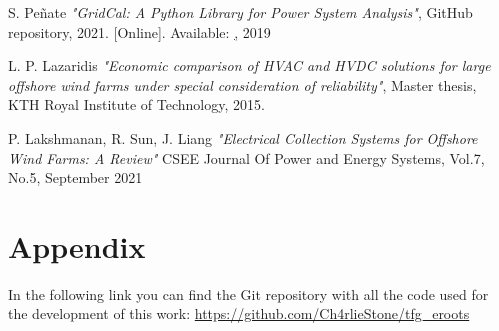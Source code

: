 \documentclass[a4paper,11pt, titlepage, twoside]{article}
\begin{document}
\begin{thebibliography}{99}
{S. Peñate}
\textit{"GridCal: A Python Library for Power System Analysis"}, GitHub repository, 2021. [Online]. Available: \href{https://github.com/SanPen/GridCal}, 2019

{L. P. Lazaridis}
\textit{"Economic comparison of HVAC and HVDC solutions for large offshore wind farms under special consideration of reliability"}, Master thesis, KTH Royal Institute of Technology, 2015.

{P. Lakshmanan, R. Sun, J. Liang}
\textit{"Electrical Collection Systems for Offshore Wind
Farms: A Review"} CSEE Journal Of Power and Energy Systems, Vol.7, No.5, September 2021














\end{thebibliography}


\section*{Appendix}\label{Appendix}

In the following link you can find the Git repository with all the code used for the development of this work:
\url{https://github.com/Ch4rlieStone/tfg_eroots}
 
\end{document}
